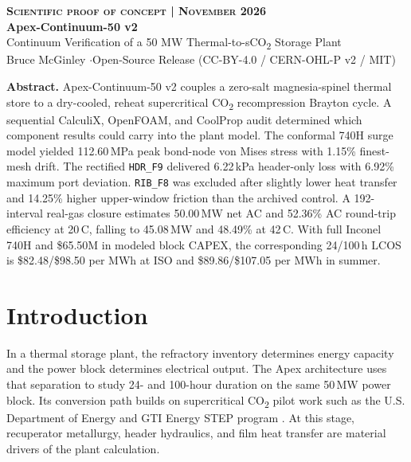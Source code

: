 \documentclass[10pt,a4paper]{article}
\begin{document}

\begin{center}
  {\small\bfseries\color{teal}\textsc{Scientific proof of concept \enspace |  November 2026}}\\[12pt]
  {\Huge\bfseries\color{primary} Apex-Continuum-50 v2}\\[8pt]
  {\Large\color{primary} Continuum Verification of a 50 MW Thermal-to-sCO\textsubscript{2} Storage Plant}\\[8pt]
  {\small\color{muted} Bruce McGinley \quad$\cdot$\quad Open-Source Release (CC-BY-4.0 / CERN-OHL-P v2 / MIT)}
\end{center}
\vspace{8pt}
\textbf{Abstract.}
Apex-Continuum-50 v2 couples a zero-salt magnesia-spinel thermal store to a dry-cooled, reheat supercritical CO\textsubscript{2} recompression Brayton cycle. A sequential CalculiX, OpenFOAM, and CoolProp audit determined which component results could carry into the plant model. The conformal 740H surge model yielded 112.60\,MPa peak bond-node von Mises stress with 1.15\% finest-mesh drift. The rectified \texttt{HDR\_F9} delivered 6.22\,kPa header-only loss with 6.92\% maximum port deviation. \texttt{RIB\_F8} was excluded after slightly lower heat transfer and 14.25\% higher upper-window friction than the archived control. A 192-interval real-gas closure estimates 50.00\,MW net AC and 52.36\% AC round-trip efficiency at 20\,\textdegree C, falling to 45.08\,MW and 48.49\% at 42\,\textdegree C. With full Inconel 740H and \$65.50M in modeled block CAPEX, the corresponding 24/100\,h LCOS is \$82.48/\$98.50 per MWh at ISO and \$89.86/\$107.05 per MWh in summer.
\vspace{4pt}


\section{Introduction}

In a thermal storage plant, the refractory inventory determines energy capacity and the power block determines electrical output. The Apex architecture uses that separation to study 24- and 100-hour duration on the same 50\,MW power block. Its conversion path builds on supercritical CO\textsubscript{2} pilot work such as the U.S. Department of Energy and GTI Energy STEP program \cite{step_demo}. At this stage, recuperator metallurgy, header hydraulics, and film heat transfer are material drivers of the plant calculation.
\end{document}
